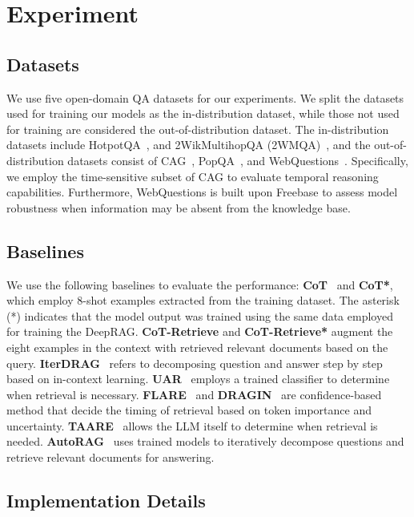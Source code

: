 
\section{Experiment}
\subsection{Datasets}
We use five open-domain QA datasets for our experiments. We split the datasets used for training our models as the in-distribution dataset, while those not used for training are considered the out-of-distribution dataset.
% 
The in-distribution datasets include HotpotQA~\cite{yang2018hotpotqa}, and 2WikMultihopQA (2WMQA)~\cite{ho-etal-2020-constructing}, and the out-of-distribution datasets consist of CAG~\cite{pan2024not}, PopQA~\cite{mallen2022not}, and WebQuestions~\cite{berant2013semantic}. 
Specifically, we employ the time-sensitive subset of CAG to evaluate temporal reasoning capabilities.
Furthermore, WebQuestions is built upon Freebase to assess model robustness when information may be absent from the knowledge base.


\subsection{Baselines}
% 
We use the following baselines to evaluate the performance: 
\textbf{CoT}~\cite{wei2022chain} and \textbf{CoT*}, which employ 8-shot examples extracted from the training dataset. The asterisk (*) indicates that the model output was trained using the same data employed for training the DeepRAG.
\textbf{CoT-Retrieve} and \textbf{CoT-Retrieve*} augment the eight examples in the context with retrieved relevant documents based on the query.
\textbf{IterDRAG}~\cite{yue2024inference} refers to decomposing question and answer step by step based on in-context learning.
\textbf{UAR}~\cite{cheng2024unified} employs a trained classifier to determine when retrieval is necessary.
\textbf{FLARE}~\cite{jiang2023flare} and \textbf{DRAGIN}~\cite{su-etal-2024-dragin} are confidence-based method that decide the timing of retrieval based on token importance and uncertainty.
\textbf{TAARE}~\cite{zhang2024retrievalqa} allows the LLM itself to determine when retrieval is needed.
\textbf{AutoRAG}~\cite{yu2024autorag} uses trained models to iteratively decompose questions and retrieve relevant documents for answering.


\subsection{Implementation Details}

